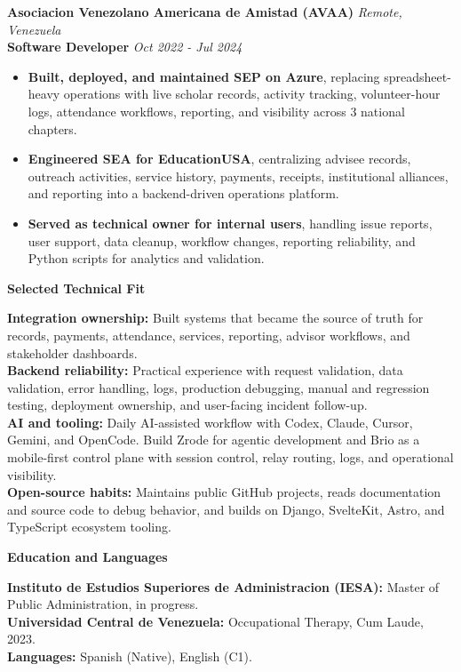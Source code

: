 \documentclass[10pt]{article}
\begin{document}
\vspace{2pt}
\textbf{Asociacion Venezolano Americana de Amistad (AVAA)} \hfill \textit{Remote, Venezuela} \\
\textbf{Software Developer} \hfill \textit{Oct 2022 - Jul 2024}
\begin{itemize}
    \item \textbf{Built, deployed, and maintained SEP on Azure}, replacing spreadsheet-heavy operations with live scholar records, activity tracking, volunteer-hour logs, attendance workflows, reporting, and visibility across 3 national chapters.
    \item \textbf{Engineered SEA for EducationUSA}, centralizing advisee records, outreach activities, service history, payments, receipts, institutional alliances, and reporting into a backend-driven operations platform.
    \item \textbf{Served as technical owner for internal users}, handling issue reports, user support, data cleanup, workflow changes, reporting reliability, and Python scripts for analytics and validation.
\end{itemize}

\vspace{3pt}
\begin{center}
    \textbf{Selected Technical Fit}
\end{center}
\vspace{-7pt}
\textbf{Integration ownership:} Built systems that became the source of truth for records, payments, attendance, services, reporting, advisor workflows, and stakeholder dashboards. \\
\textbf{Backend reliability:} Practical experience with request validation, data validation, error handling, logs, production debugging, manual and regression testing, deployment ownership, and user-facing incident follow-up. \\
\textbf{AI and tooling:} Daily AI-assisted workflow with Codex, Claude, Cursor, Gemini, and OpenCode. Build Zrode for agentic development and Brio as a mobile-first control plane with session control, relay routing, logs, and operational visibility. \\
\textbf{Open-source habits:} Maintains public GitHub projects, reads documentation and source code to debug behavior, and builds on Django, SvelteKit, Astro, and TypeScript ecosystem tooling.

\vspace{3pt}
\begin{center}
    \textbf{Education and Languages}
\end{center}
\vspace{-7pt}
\textbf{Instituto de Estudios Superiores de Administracion (IESA):} Master of Public Administration, in progress. \\
\textbf{Universidad Central de Venezuela:} Occupational Therapy, Cum Laude, 2023. \\
\textbf{Languages:} Spanish (Native), English (C1).
\end{document}
